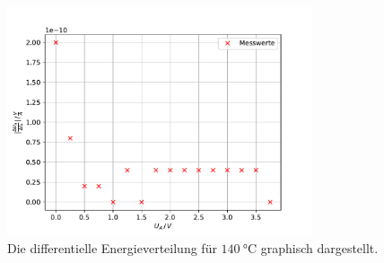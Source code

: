 \begin{figure}
    \centering
    \includegraphics[width=0.8\textwidth]{content/data/140_grad_dif.pdf}
    \caption{Die differentielle Energieverteilung für $\SI{140}{\degreeCelsius}$ graphisch dargestellt. \cite{matplotlib}\cite{numpy}}
    \label{fig:140_grad_dif}
\end{figure}
\FloatBarrier

